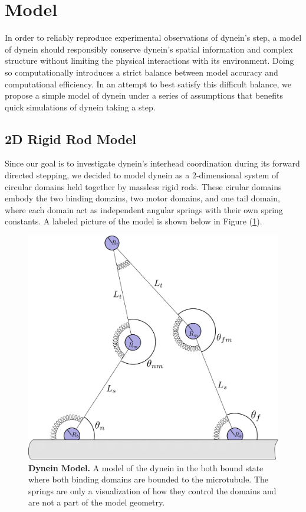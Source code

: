 \section{Model}
In order to reliably reproduce experimental observations of dynein's step, a model of dynein should responsibly conserve dynein's spatial information and complex structure without limiting the physical interactions with its environment. Doing so computationally introduces a strict balance between model accuracy and computational efficiency. In an attempt to best satisfy this difficult balance, we propose a simple model of dynein under a series of assumptions that benefits quick simulations of dynein taking a step. 


\subsection{2D Rigid Rod Model}
Since our goal is to investigate dynein's interhead coordination during its forward directed stepping, we decided to model dynein as a 2-dimensional system of circular domains held together by massless rigid rods. These cirular domains embody the two binding domains, two motor domains, and one tail domain, where each domain act as independent angular springs with their own spring constants. A labeled picture of the model is shown below in Figure (\ref{fig:model}). 

\begin{figure}[H]
	\centering
	\includegraphics[width=0.6\columnwidth]{Figures/model-cartoon.png}
	\caption[Dynein Model]{\textbf{Dynein Model.} A model of the dynein in the both bound state where both binding domains are bounded to the microtubule. The springs are only a visualization of how they control the domains and are not a part of the model geometry. \cite{Capek2017}}
	\label{fig:model}
\end{figure}

